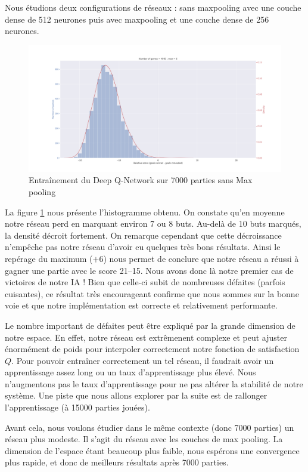 Nous étudions deux configurations de réseaux : sans maxpooling avec une couche dense de 512 neurones puis avec maxpooling et une couche dense de 256 neurones.

\begin{figure}[h]
 \centering
 \includegraphics[width = \textwidth]{img/DQL_7000_withoutMax.png}
 \caption{Entraînement du Deep Q-Network sur 7000 parties sans Max pooling}
 \label{fig:DQL_7000_withoutMax}
\end{figure}

La figure \ref{fig:DQL_7000_withoutMax} nous présente l'histogramme obtenu. On constate qu'en moyenne notre réseau perd en marquant environ 7 ou 8 buts. Au-delà de 
10 buts marqués, la densité décroit fortement. On remarque cependant que cette décroissance n'empêche pas notre réseau d'avoir eu quelques très bons résultats.
Ainsi le repérage du maximum ($+\num{6}$) nous permet de conclure que notre réseau a réussi à gagner une partie avec le score 21--15. Nous avons donc là notre premier cas 
de victoires de notre IA ! Bien que celle-ci subit de nombreuses défaites (parfois cuisantes), ce résultat très encourageant confirme que nous sommes sur la bonne voie 
et que notre implémentation est correcte et relativement performante.

Le nombre important de défaites peut être expliqué par la grande dimension de notre espace. En effet, notre réseau est extrêmenent complexe et peut ajuster énormément 
de poids pour interpoler correctement notre fonction de satisfaction $Q$. Pour pouvoir entraîner correctement un tel réseau, il faudrait avoir un apprentissage assez 
long ou un taux d'apprentissage plus élevé. Nous n'augmentons pas le taux d'apprentissage pour ne pas altérer la stabilité de notre système. Une piste que nous
allons explorer par la suite est de rallonger l'apprentissage (à 15000 parties jouées). 

Avant cela, nous voulons étudier dans le même contexte (donc 7000 parties) un réseau plus modeste. Il s'agit du réseau avec les couches de max pooling. La dimension
de l'espace étant beaucoup plus faible, nous espérons une convergence plus rapide, et donc de meilleurs résultats après 7000 parties.

